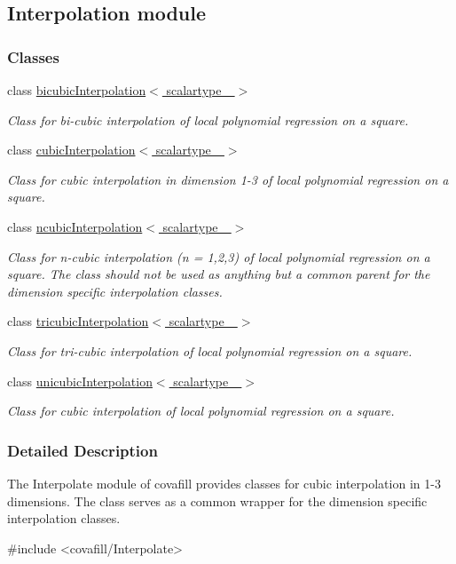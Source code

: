 \hypertarget{group__interpolate}{}\subsection{Interpolation module}
\label{group__interpolate}
\subsubsection*{Classes}
\begin{DoxyCompactItemize}
\item 
class \hyperlink{classbicubicInterpolation}{bicubic\+Interpolation$<$ scalartype\+\_\+ $>$}
\begin{DoxyCompactList}\small\item\em Class for bi-\/cubic interpolation of local polynomial regression on a square. \end{DoxyCompactList}\item 
class \hyperlink{classcubicInterpolation}{cubic\+Interpolation$<$ scalartype\+\_\+ $>$}
\begin{DoxyCompactList}\small\item\em Class for cubic interpolation in dimension 1-\/3 of local polynomial regression on a square. \end{DoxyCompactList}\item 
class \hyperlink{classncubicInterpolation}{ncubic\+Interpolation$<$ scalartype\+\_\+ $>$}
\begin{DoxyCompactList}\small\item\em Class for n-\/cubic interpolation (n = 1,2,3) of local polynomial regression on a square. The class should not be used as anything but a common parent for the dimension specific interpolation classes. \end{DoxyCompactList}\item 
class \hyperlink{classtricubicInterpolation}{tricubic\+Interpolation$<$ scalartype\+\_\+ $>$}
\begin{DoxyCompactList}\small\item\em Class for tri-\/cubic interpolation of local polynomial regression on a square. \end{DoxyCompactList}\item 
class \hyperlink{classunicubicInterpolation}{unicubic\+Interpolation$<$ scalartype\+\_\+ $>$}
\begin{DoxyCompactList}\small\item\em Class for cubic interpolation of local polynomial regression on a square. \end{DoxyCompactList}\end{DoxyCompactItemize}


\subsubsection{Detailed Description}
The Interpolate module of covafill provides classes for cubic interpolation in 1-\/3 dimensions. The class serves as a common wrapper for the dimension specific interpolation classes. \begin{DoxyVerb}#include <covafill/Interpolate>
\end{DoxyVerb}
 